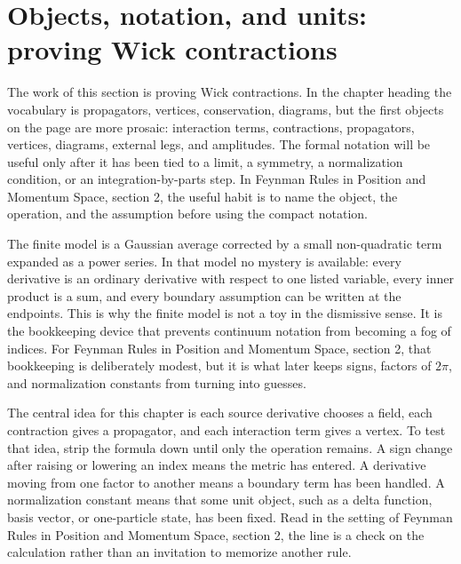\section{Objects, notation, and units: proving Wick contractions}













The work of this section is proving Wick contractions.  In the chapter heading the vocabulary is propagators, vertices, conservation, diagrams, but the first objects on the page are more prosaic: interaction terms, contractions, propagators, vertices, diagrams, external legs, and amplitudes.  The formal notation will be useful only after it has been tied to a limit, a symmetry, a normalization condition, or an integration-by-parts step.  In Feynman Rules in Position and Momentum Space, section 2, the useful habit is to name the object, the operation, and the assumption before using the compact notation.

The finite model is a Gaussian average corrected by a small non-quadratic term expanded as a power series.  In that model no mystery is available: every derivative is an ordinary derivative with respect to one listed variable, every inner product is a sum, and every boundary assumption can be written at the endpoints.  This is why the finite model is not a toy in the dismissive sense.  It is the bookkeeping device that prevents continuum notation from becoming a fog of indices.  For Feynman Rules in Position and Momentum Space, section 2, that bookkeeping is deliberately modest, but it is what later keeps signs, factors of \(2\pi\), and normalization constants from turning into guesses.

The central idea for this chapter is each source derivative chooses a field, each contraction gives a propagator, and each interaction term gives a vertex.  To test that idea, strip the formula down until only the operation remains.  A sign change after raising or lowering an index means the metric has entered.  A derivative moving from one factor to another means a boundary term has been handled.  A normalization constant means that some unit object, such as a delta function, basis vector, or one-particle state, has been fixed.  Read in the setting of Feynman Rules in Position and Momentum Space, section 2, the line is a check on the calculation rather than an invitation to memorize another rule.

